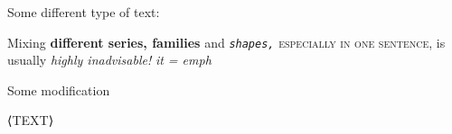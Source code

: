 Some different type of text:\hfill

Mixing \textbf{different series, \textsf{families}} and
\textsl{\texttt{shapes,}} \textsc{especially in one sentence,}
is usually \emph{highly inadvisable!}\textit{ it = emph}

Some modification 

\MakeTextUppercase{⟨text⟩}









    








